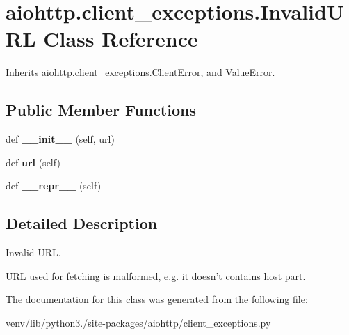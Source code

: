 \hypertarget{classaiohttp_1_1client__exceptions_1_1_invalid_u_r_l}{}\section{aiohttp.\+client\+\_\+exceptions.\+Invalid\+U\+RL Class Reference}
\label{classaiohttp_1_1client__exceptions_1_1_invalid_u_r_l}


Inherits \hyperlink{classaiohttp_1_1client__exceptions_1_1_client_error}{aiohttp.\+client\+\_\+exceptions.\+Client\+Error}, and Value\+Error.

\subsection*{Public Member Functions}
\begin{DoxyCompactItemize}
\item 
\mbox{\label{classaiohttp_1_1client__exceptions_1_1_invalid_u_r_l_a557b3276c309e3fd0772711d87b2674a}} 
def {\bfseries \+\_\+\+\_\+init\+\_\+\+\_\+} (self, url)
\item 
\mbox{\label{classaiohttp_1_1client__exceptions_1_1_invalid_u_r_l_a1b36e313831791cf2a4fdb2f7506e38e}} 
def {\bfseries url} (self)
\item 
\mbox{\label{classaiohttp_1_1client__exceptions_1_1_invalid_u_r_l_ae9d056936e186744b0b49875d74bc2ff}} 
def {\bfseries \+\_\+\+\_\+repr\+\_\+\+\_\+} (self)
\end{DoxyCompactItemize}


\subsection{Detailed Description}
\begin{DoxyVerb}Invalid URL.

URL used for fetching is malformed, e.g. it doesn't contains host
part.\end{DoxyVerb}
 

The documentation for this class was generated from the following file\+:\begin{DoxyCompactItemize}
\item 
venv/lib/python3./site-\/packages/aiohttp/client\+\_\+exceptions.\+py\end{DoxyCompactItemize}
